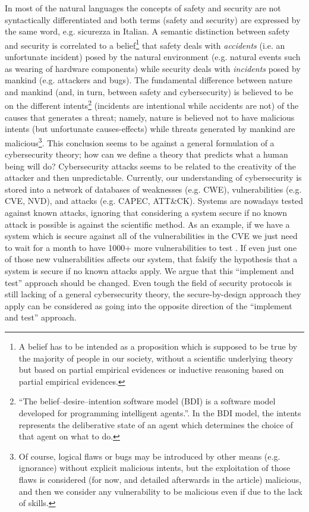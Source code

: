 \documentclass[conference]{IEEEtran}
\begin{document}
In most of the natural languages the concepts of safety
and security are not syntactically differentiated and both terms (safety and
security) are expressed by the same word, e.g. sicurezza in Italian.  A
semantic distinction between safety and security is correlated to a
belief\footnote{A belief has to be intended as a proposition which is supposed
to be true by the majority of people in our society, without a scientific
underlying theory but based on partial empirical evidences or inductive reasoning based on partial empirical evidences.} that
safety deals with \emph{accidents} (i.e. an unfortunate incident) posed by the
natural environment (e.g. natural events such as wearing of hardware
components) while security deals with \emph{incidents} posed by mankind (e.g.
attackers and bugs).  The fundamental difference between nature and mankind (and,
in turn, between safety and cybersecurity) is believed to be on the different
intents\footnote{``The belief–desire–intention software model (BDI) is a
software model developed for programming intelligent
agents.''\autocite{wiki-bdi}. In the BDI model, the intents represents the
deliberative state of an agent which determines the choice of that agent on
what to do.} (incidents are intentional while accidents are not) of the causes
that generates a threat; namely, nature is believed not to have malicious
intents (but unfortunate causes-effects) while threats generated by mankind are
malicious\footnote{Of course, logical flaws or bugs may be
introduced by other means (e.g. ignorance) without explicit malicious intents,
but the exploitation of those flaws is considered (for now, and detailed
afterwards in the article) malicious, and then we consider any vulnerability to
be malicious even if due to the lack of skills.}.
This conclusion seems to be against a general formulation of a cybersecurity theory;
how can we define a theory that predicts what a human being will do?
Cybersecurity attacks seems to be related to the creativity of the attacker
and then unpredictable. Currently, our understanding of cybersecurity is
stored into a network of databases of weaknesses (e.g.
CWE\autocite{MITRE2020CWEresearch}), vulnerabilities (e.g. CVE\autocite{CVE},
NVD\autocite{NIST2020NVD}),
and attacks (e.g. CAPEC\autocite{MITRE2020CAPEC}, ATT\&CK\autocite{MITRE2020ATTACK}). Systems are
nowadays tested against 
known attacks, ignoring that considering a system secure
if no known attack is possible is against the scientific method.
As an example, if we have a system which is secure against all of the
vulnerabilities in the CVE we just need to wait for a month to have 1000+ more
vulnerabilities to test \autocite{NVD2020dashboard}. If even just one of those new vulnerabilities
affects our system, that falsify the hypothesis that a
system is secure if no known attacks apply. 
We argue that this ``implement and test'' approach should be changed.
Even tough the field 
of security protocols is still lacking of a general cybersecurity theory,
the secure-by-design approach they apply can be considered as going
into the opposite direction of the ``implement and test'' approach.
\end{document}
